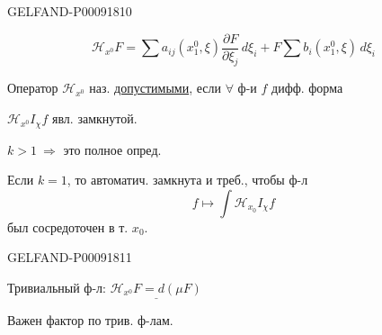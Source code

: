 \begin{GelfandAdjacentEvidence}{GELFAND-P000918}{10}


\begin{equation*}
 \mathcal H_{x^0}F=
 \sum a_{ij}(x_1^0,\xi)\frac{\partial F}{\partial\xi_j}\,d\xi_i
 + F\sum b_i(x_1^0,\xi)\,d\xi_i
\end{equation*}

Оператор $\mathcal H_{x^0}$ наз. \uline{допустимыми}, если $\forall$ ф-и $f$ дифф. форма

\(\mathcal H_{x^0}I_\chi f\) явл. замкнутой.

\(k>1\ \Rightarrow\) это полное опред.

Если $k=1$, то автоматич. замкнута и треб., чтобы ф-л
\begin{equation*}
 f\mapsto\int\mathcal H_{x_0}I_\chi f
\end{equation*}
был сосредоточен в т. \(x_0\).
\end{GelfandAdjacentEvidence}
\begin{GelfandAdjacentEvidence}{GELFAND-P000918}{11}


Тривиальный ф-л: \(\underline{\mathcal H_{x^0}F=d(\mu F)}\)
\end{GelfandAdjacentEvidence}


Важен фактор по трив. ф-лам.


\clearpage
{}
